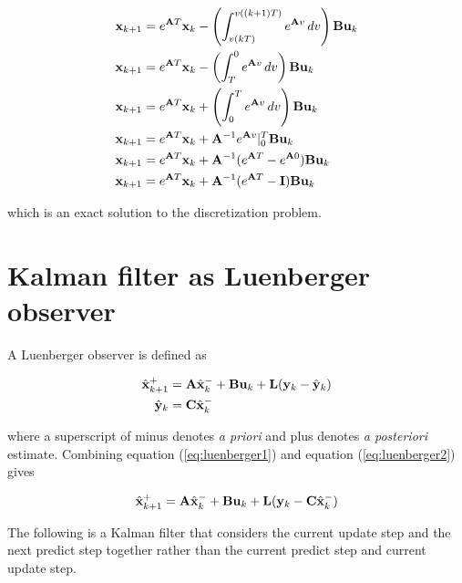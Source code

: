 \begin{align*}
  \mathbf{x}_{k+1} &= e^{\mathbf{A}T}\mathbf{x}_k -
    \left(\int_{v(kT)}^{v((k + 1)T)} e^{\mathbf{A}v} \,dv\right)
    \mathbf{B}\mathbf{u}_k \\
  \mathbf{x}_{k+1} &= e^{\mathbf{A}T}\mathbf{x}_k -
    \left(\int_T^0 e^{\mathbf{A}v} \,dv\right) \mathbf{B}\mathbf{u}_k \\
  \mathbf{x}_{k+1} &= e^{\mathbf{A}T}\mathbf{x}_k +
    \left(\int_0^T e^{\mathbf{A}v} \,dv\right) \mathbf{B}\mathbf{u}_k \\
  \mathbf{x}_{k+1} &= e^{\mathbf{A}T}\mathbf{x}_k +
    \mathbf{A}^{-1}e^{\mathbf{A}v} \rvert_0^T \mathbf{B}\mathbf{u}_k \\
  \mathbf{x}_{k+1} &= e^{\mathbf{A}T}\mathbf{x}_k +
    \mathbf{A}^{-1}(e^{\mathbf{A}T} - e^{\mathbf{A}0}) \mathbf{B}\mathbf{u}_k \\
  \mathbf{x}_{k+1} &= e^{\mathbf{A}T}\mathbf{x}_k +
    \mathbf{A}^{-1}(e^{\mathbf{A}T} - \mathbf{I}) \mathbf{B}\mathbf{u}_k
\end{align*}

which is an exact solution to the \gls{discretization} problem.

\section{Kalman filter as Luenberger observer}
\label{sec:deriv_kalman_luenberger}

A Luenberger \gls{observer} is defined as

\begin{align}
  \hat{\mathbf{x}}_{k+1}^+ &= \mathbf{A}\hat{\mathbf{x}}_k^- + \mathbf{B}\mathbf{u}_k + \mathbf{L}
    (\mathbf{y}_k - \hat{\mathbf{y}}_k) \label{eq:luenberger1} \\
  \hat{\mathbf{y}}_k &= \mathbf{C} \hat{\mathbf{x}}_k^- \label{eq:luenberger2}
\end{align}

where a superscript of minus denotes \textit{a priori} and plus denotes
\textit{a posteriori} estimate. Combining equation (\ref{eq:luenberger1}) and
equation (\ref{eq:luenberger2}) gives

\begin{equation} \label{eq:luenberger}
  \hat{\mathbf{x}}_{k+1}^+ = \mathbf{A}\hat{\mathbf{x}}_k^- + \mathbf{B}\mathbf{u}_k + \mathbf{L}
    (\mathbf{y}_k - \mathbf{C}\hat{\mathbf{x}}_k^-)
\end{equation}

The following is a Kalman filter that considers the current update step and the
next predict step together rather than the current predict step and current
update step.

